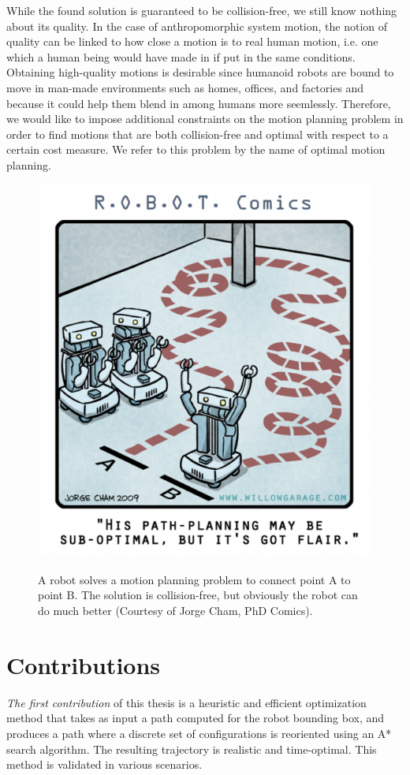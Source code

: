 While the found solution is guaranteed to be collision-free, we still
know nothing about its quality. In the case of anthropomorphic system
motion, the notion of quality can be linked to how close a motion is
to real human motion, i.e. one which a human being would have made in
if put in the same conditions. Obtaining high-quality motions is
desirable since humanoid robots are bound to move in man-made
environments such as homes, offices, and factories and because it
could help them blend in among humans more seemlessly. Therefore, we
would like to impose additional constraints on the motion planning
problem in order to find motions that are both collision-free and
optimal with respect to a certain cost measure. We refer to this
problem by the name of optimal motion planning.

\begin{figure}[h!]
  \centering
      {\includegraphics[width = 0.6\linewidth]
        {src/chap0-introduction/optimal-motion-planning.png}}
      \caption{A robot solves a motion planning problem to connect
        point A to point B. The solution is collision-free, but
        obviously the robot can do much better (Courtesy of Jorge
        Cham, PhD Comics).}
      \label{fig:chap0-optimal-motion-planning}
\end{figure}

\section{Contributions}

\emph{The first contribution} of this thesis is a heuristic and
efficient optimization method that takes as input a path computed for
the robot bounding box, and produces a path where a discrete set of
configurations is reoriented using an A* search algorithm. The
resulting trajectory is realistic and time-optimal. This method is
validated in various scenarios.

